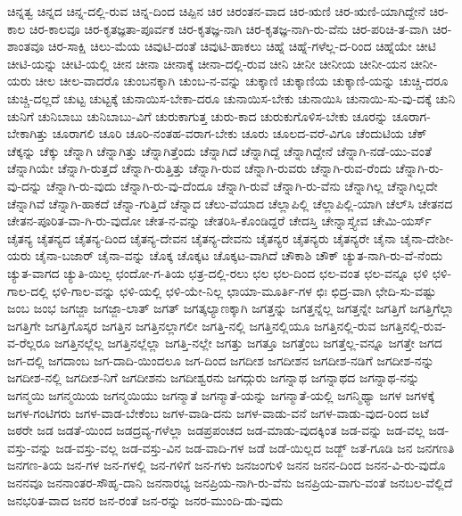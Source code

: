 {ಚಿನ್ನತ್ವ
ಚಿನ್ನದ
ಚಿನ್ನ-ದಲ್ಲಿ-ರುವ
ಚಿನ್ನ-ದಿಂದ
ಚಿಪ್ಪಿನ
ಚಿರ
ಚಿರಂತನ-ವಾದ
ಚಿರ-ಋಣಿ
ಚಿರ-ಋಣಿ-ಯಾಗಿದ್ದೇನೆ
ಚಿರ-ಕಾಲ
ಚಿರ-ಕಾಲವೂ
ಚಿರ-ಕೃತಜ್ಞತಾ-ಪೂರ್ವಕ
ಚಿರ-ಕೃತಜ್ಞ-ನಾಗಿ
ಚಿರ-ಕೃತಜ್ಞ-ನಾಗಿ-ರು-ವೆನು
ಚಿರ-ಪರಿಚಿ-ತ-ವಾಗಿ
ಚಿರ-ಶಾಂತವೂ
ಚಿರ-ಸಾಕ್ಷಿ
ಚಿಲು-ಮೆಯ
ಚಿವುಟಿ-ದಂತೆ
ಚಿವುಟಿ-ಹಾಕಲು
ಚಿಹ್ನೆ
ಚಿಹ್ನೆ-ಗಳೆಲ್ಲ-ದ-ರಿಂದ
ಚಿಹ್ನೆಯೇ
ಚೀಟಿ
ಚೀಟಿ-ಯನ್ನು
ಚೀಟಿ-ಯಲ್ಲಿ
ಚೀನ
ಚೀನಾ
ಚೀನಾಕ್ಕೆ
ಚೀನಾ-ದಲ್ಲಿ-ರುವ
ಚೀನಿ
ಚೀನೀ
ಚೀನೀಯ
ಚೀನೀ-ಯನ
ಚೀನೀ-ಯರು
ಚೀಲ
ಚೀಲ-ವಾದರೊ
ಚುಂಬನಕ್ಕಾಗಿ
ಚುಂಬ-ನ-ವನ್ನು
ಚುಕ್ಕಾಣಿ
ಚುಕ್ಕಾಣಿಯ
ಚುಕ್ಕಾಣಿ-ಯನ್ನು
ಚುಚ್ಚಿ-ದರೂ
ಚುಚ್ಚಿ-ದಲ್ಲದೆ
ಚುಟ್ಟ
ಚುಟ್ಟಕ್ಕೆ
ಚುನಾಯಿಸ-ಬೇಕಾ-ದರೂ
ಚುನಾಯಿಸ-ಬೇಕು
ಚುನಾಯಿಸಿ
ಚುನಾಯಿ-ಸು-ವು-ದಕ್ಕೆ
ಚುನಿ
ಚುನಿಗೆ
ಚುನಿಬಾಬು
ಚುನಿಬಾಬು-ವಿಗೆ
ಚುರುಕಾಗುತ್ತ
ಚುರು-ಕಾದ
ಚುರುಕುಗೊಳಿಸ-ಬೇಕು
ಚೂರನ್ನು
ಚೂರಾಗ-ಬೇಕಾಗಿತ್ತು
ಚೂರಾಗಲಿ
ಚೂರಿ
ಚೂರಿ-ನಂತಹ-ವರಾಗ-ಬೇಕು
ಚೂರು
ಚೂಲದ-ವರೆ-ವಿಗೂ
ಚೆಂದುಟಿಯ
ಚೆಕ್
ಚೆಕ್ಕನ್ನು
ಚೆಕ್ಕು
ಚೆನ್ನಾಗಿ
ಚೆನ್ನಾಗಿತ್ತು
ಚೆನ್ನಾಗಿತ್ತೆಂದು
ಚೆನ್ನಾಗಿದೆ
ಚೆನ್ನಾಗಿದ್ದೆ
ಚೆನ್ನಾಗಿದ್ದೇನೆ
ಚೆನ್ನಾಗಿ-ನಡೆ-ಯು-ವಂತೆ
ಚೆನ್ನಾಗಿಯೇ
ಚೆನ್ನಾಗಿ-ರುತ್ತದೆ
ಚೆನ್ನಾಗಿ-ರುತ್ತಿತ್ತು
ಚೆನ್ನಾಗಿ-ರುವ
ಚೆನ್ನಾಗಿ-ರುವರು
ಚೆನ್ನಾಗಿ-ರುವ-ರೆಂದು
ಚೆನ್ನಾಗಿ-ರು-ವು-ದನ್ನು
ಚೆನ್ನಾಗಿ-ರು-ವುದು
ಚೆನ್ನಾಗಿ-ರು-ವು-ದೆಂದೂ
ಚೆನ್ನಾಗಿ-ರುವೆ
ಚೆನ್ನಾಗಿ-ರು-ವೆನು
ಚೆನ್ನಾಗಿಲ್ಲ
ಚೆನ್ನಾಗಿಲ್ಲದೇ
ಚೆನ್ನಾಗಿವೆ
ಚೆನ್ನಾಗಿ-ಹಾಕದೆ
ಚೆನ್ನಾ-ಗುತ್ತಿದೆ
ಚೆನ್ನಾದ
ಚೆಲು-ವೆಯಾದ
ಚೆಲ್ಲಾಪಿಲ್ಲಿ
ಚೆಲ್ಲಾಪಿಲ್ಲಿ-ಯಾಗಿ
ಚೆಲ್‌ಸಿ
ಚೇತನದ
ಚೇತನ-ಪೂರಿತ-ವಾ-ಗಿ-ರು-ವುದೋ
ಚೇತ-ನ-ವನ್ನು
ಚೇತರಿಸಿ-ಕೊಂಡಿದ್ದರೆ
ಚೇದಸ್ತಿ
ಚೇನ್ನಾಸ್ತ್ಯೇವ
ಚೇಮಿ-ಯರ್ಸ್
ಚೈತನ್ಯ
ಚೈತನ್ಯದ
ಚೈತನ್ಯ-ದಿಂದ
ಚೈತನ್ಯ-ದೇವನ
ಚೈತನ್ಯ-ದೇವನು
ಚೈತನ್ಯರ
ಚೈತನ್ಯರು
ಚೈತನ್ಯರೇ
ಚೈನಾ
ಚೈನಾ-ದೇಶೀ-ಯರು
ಚೈನಾ-ಬಜಾರ್
ಚೈನಾ-ವನ್ನು
ಚೊಕ್ಕ
ಚೊಕ್ಕಟ
ಚೊಕ್ಕಟ-ವಾಗಿದೆ
ಚೌಕಾಶಿ
ಚೌಕ್
ಚ್ಯುತ-ನಾಗಿ-ರು-ವೆ-ನೆಂದು
ಚ್ಯುತ-ವಾಗದ
ಚ್ಯುತಿ-ಯಿಲ್ಲ
ಛಂದೋ-ಗ-ತಿಯ
ಛತ್ರ-ದಲ್ಲಿ-ರಲು
ಛಲ
ಛಲ-ದಿಂದ
ಛಲ-ವಂತ
ಛಲ-ವನ್ನೂ
ಛಳಿ
ಛಳಿ-ಗಾಲ-ದಲ್ಲಿ
ಛಳಿ-ಗಾಲ-ವನ್ನು
ಛಳಿ-ಯಲ್ಲಿ
ಛಳಿ-ಯೇ-ನಿಲ್ಲ
ಛಾಯಾ-ಮೂರ್ತಿ-ಗಳ
ಛಿಃ
ಛಿದ್ರ-ವಾಗಿ
ಛೇದಿ-ಸು-ವಷ್ಟು
ಜಂಬ
ಜಂಭ
ಜಗಜ್ಜಾ
ಜಗಜ್ಜಾ-ಲಾತ್
ಜಗತ್
ಜಗತ್ಕಲ್ಯಾಣಕ್ಕಾಗಿ
ಜಗತ್ತನ್ನು
ಜಗತ್ತನ್ನೆಲ್ಲ
ಜಗತ್ತನ್ನೇ
ಜಗತ್ತಿಗೆ
ಜಗತ್ತಿಗೆಲ್ಲಾ
ಜಗತ್ತಿಗೇ
ಜಗತ್ತಿಗೊಸ್ಕರ
ಜಗತ್ತಿನ
ಜಗತ್ತಿನಲ್ಲಾಗಲೀ
ಜಗತ್ತಿ-ನಲ್ಲಿ
ಜಗತ್ತಿನಲ್ಲಿಯೂ
ಜಗತ್ತಿನಲ್ಲಿ-ರುವ
ಜಗತ್ತಿನಲ್ಲಿ-ರುವ-ವ-ರೆಲ್ಲರೂ
ಜಗತ್ತಿನಲ್ಲೆಲ್ಲ
ಜಗತ್ತಿನಲ್ಲೆಲ್ಲಾ
ಜಗತ್ತಿ-ನಲ್ಲೇ
ಜಗತ್ತು
ಜಗತ್ತೂ
ಜಗತ್ತೆಂಬ
ಜಗತ್ತೆಲ್ಲ-ವನ್ನೂ
ಜಗತ್ತೇ
ಜಗದ
ಜಗ-ದಲ್ಲಿ
ಜಗದಾಂಬ
ಜಗ-ದಾದಿ-ಯಿಂದಲೂ
ಜಗ-ದಿಂದ
ಜಗದೀಶ
ಜಗದೀಶನ
ಜಗದೀಶ-ನಡಿಗೆ
ಜಗದೀಶ-ನನ್ನು
ಜಗದೀಶ-ನಲ್ಲಿ
ಜಗದೀಶ-ನಿಗೆ
ಜಗದೀಶನು
ಜಗದೀಶ್ವರನು
ಜಗದ್ಗುರು
ಜಗನ್ನಾಥ
ಜಗನ್ನಾಥದ
ಜಗನ್ನಾಥ-ನನ್ನು
ಜಗನ್ಮಯಿ
ಜಗನ್ಮಯಿಯ
ಜಗನ್ಮಯಿಯು
ಜಗನ್ಮಾತೆ
ಜಗನ್ಮಾತೆ-ಯನ್ನು
ಜಗನ್ಮಾತೆ-ಯಲ್ಲಿ
ಜಗನ್ಮಿಥ್ಯಾ
ಜಗಳ
ಜಗಳಕ್ಕೆ
ಜಗಳ-ಗಂಟಿಗರು
ಜಗಳ-ವಾಡ-ಬೇಕೆಂಬ
ಜಗಳ-ವಾಡಿ-ದನು
ಜಗಳ-ವಾಡು-ವನೆ
ಜಗಳ-ವಾಡು-ವುದ-ರಿಂದ
ಜಟೆ
ಜಠರೇ
ಜಡ
ಜಡತೆ-ಯಿಂದ
ಜಡದ್ರವ್ಯ-ಗಳೆಲ್ಲಾ
ಜಡಪ್ರಪಂಚದ
ಜಡ-ಮಾಡು-ವುದಕ್ಕಿಂತ
ಜಡ-ವನ್ನು
ಜಡ-ವಲ್ಲ
ಜಡ-ವಸ್ತು-ವನ್ನು
ಜಡ-ವಸ್ತು-ವಲ್ಲ
ಜಡ-ವಸ್ತು-ವಿನ
ಜಡ-ವಾದಿ-ಗಳ
ಜಡೆ
ಜಡೆ-ಯಿಲ್ಲದ
ಜಡ್ಜ್
ಜತೆ-ಗೂಡಿ
ಜನ
ಜನಗಣತಿ
ಜನಗಣ-ತಿಯ
ಜನ-ಗಳ
ಜನ-ಗಳಲ್ಲಿ
ಜನ-ಗಳಿಗೆ
ಜನ-ಗಳು
ಜನಜಂಗುಳಿ
ಜನನ
ಜನನ-ದಿಂದ
ಜನನ-ವಿ-ರು-ವುದೊ
ಜನನವೂ
ಜನನಾಂತರ-ಸೌಹೃ-ದಾನಿ
ಜನನಾರಭ್ಯ
ಜನಪ್ರಿಯ-ನಾಗಿ-ರು-ವೆನು
ಜನಪ್ರಿಯ-ವಾಗು-ವಂತೆ
ಜನಬಲ-ವೆಲ್ಲಿದೆ
ಜನಭರಿತ-ವಾದ
ಜನರ
ಜನ-ರಂತೆ
ಜನ-ರನ್ನು
ಜನರ-ಮುಂದಿ-ಡು-ವುದು
}
